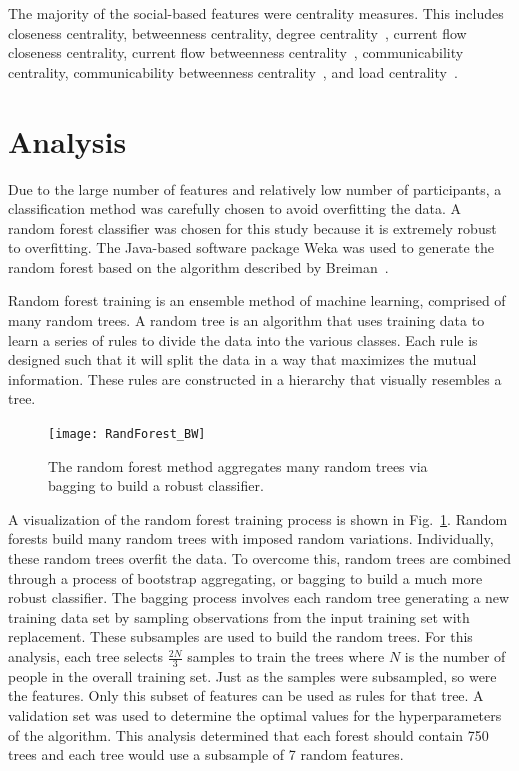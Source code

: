 \documentclass[10pt,twocolumn,conference]{IEEEtran}
\begin{document}
The majority of the social-based features were centrality measures.
This includes closeness centrality, betweenness centrality, degree centrality~\cite{borgatti2011analyzing}, current flow closeness centrality, current flow betweenness centrality~\cite{brandes2005centrality}, communicability centrality, communicability betweenness centrality~\cite{estrada2008communicability}, and load centrality~\cite{newman2001structure}.

\section{Analysis} \label{Analysis}
Due to the large number of features and relatively low number of participants, a classification method was carefully chosen to avoid overfitting the data.
A random forest classifier was chosen for this study because it is extremely robust to overfitting.
The Java-based software package Weka was used to generate the random forest based on the algorithm described by Breiman~\cite{Breiman2001}.

Random forest training is an ensemble method of machine learning, comprised of many random trees.
A random tree is an algorithm that uses training data to learn a series of rules to divide the data into the various classes.
Each rule is designed such that it will split the data in a way that maximizes the mutual information.
These rules are constructed in a hierarchy that visually resembles a tree.


\begin{figure}[t]
	\centering
	\texttt{[image: RandForest\_BW]}
	\caption{The random forest method aggregates many random trees via bagging to build a robust classifier.}
	\label{fig:rand_forest}
\end{figure}  


A visualization of the random forest training process is shown in Fig.~\ref{fig:rand_forest}.
Random forests build many random trees with imposed random variations.
Individually, these random trees overfit the data.
To overcome this, random trees are combined through a process of bootstrap aggregating, or bagging to build a much more robust classifier.
The bagging process involves each random tree generating a new training data set by sampling observations from the input training set with replacement.
These subsamples are used to build the random trees.
For this analysis, each tree selects $\frac{2N}{3}$ samples to train the trees where $N$ is the number of people in the overall training set.
Just as the samples were subsampled, so were the features.
Only this subset of features can be used as rules for that tree.
A validation set was used to determine the optimal values for the hyperparameters of the algorithm.
This analysis determined that each forest should contain 750 trees and each tree would use a subsample of 7 random features.
\end{document}
